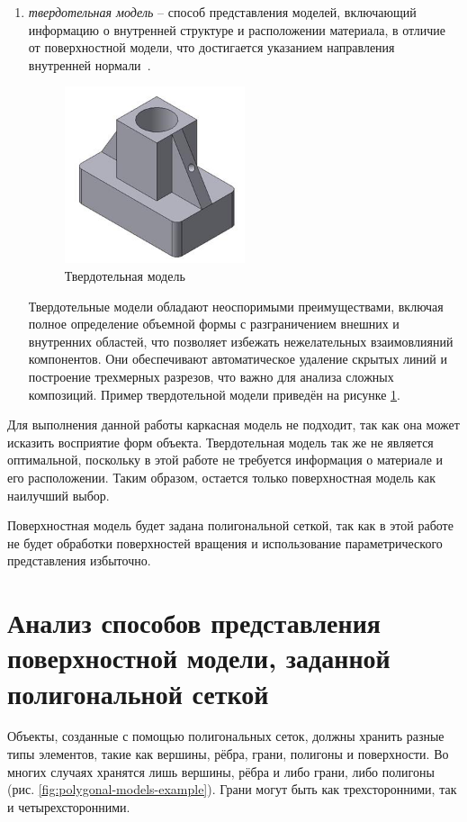 \begin{enumerate}
	\item \textit{твердотельная модель} -- способ представления моделей, включающий информацию о внутренней структуре и расположении материала, в отличие от поверхностной модели, что достигается указанием направления внутренней нормали~\cite{lit1}.
	\begin{figure}[h] 
		\centering
		\includegraphics[width=0.5\textwidth]{images/solidum-statu-models.png}
		\caption{Твердотельная модель} 
		\label{fig:solidum-statu-models} 
	\end{figure}
	Твердотельные модели обладают неоспоримыми преимуществами, включая полное определение объемной формы с разграничением внешних и внутренних областей, что позволяет избежать нежелательных взаимовлияний компонентов. Они обеспечивают автоматическое удаление скрытых линий и построение трехмерных разрезов, что важно для анализа сложных композиций. Пример твердотельной модели приведён на рисунке \ref{fig:solidum-statu-models}.
\end{enumerate}
	
Для выполнения данной работы каркасная модель не подходит, так как она может исказить восприятие форм объекта. Твердотельная модель так же не является оптимальной, поскольку в этой работе не требуется информация о материале и его расположении. Таким образом, остается только поверхностная модель как наилучший выбор. 

Поверхностная модель будет задана полигональной сеткой, так как в этой работе не будет обработки поверхностей вращения и использование параметрического представления избыточно.

\section{Анализ способов представления поверхностной модели, заданной полигональной сеткой}

Объекты, созданные с помощью полигональных сеток, должны хранить разные типы элементов, такие как вершины, рёбра, грани, полигоны и поверхности. Во многих случаях хранятся лишь вершины, рёбра и либо грани, либо полигоны (рис. \ref{fig:polygonal-models-example}). Грани могут быть как трехсторонними, так и четырехсторонними.

